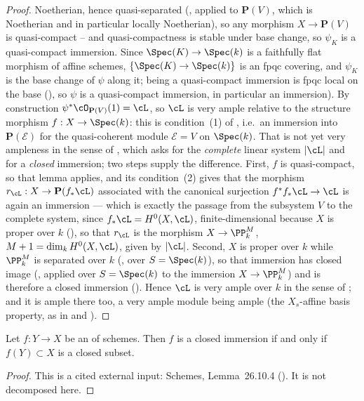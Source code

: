 \begin{proof}
Noetherian, hence
quasi-separated (,
applied to $\mathbf P(V)$, which is Noetherian and in particular
locally Noetherian), so any morphism $X\to\mathbf P(V)$ is quasi-compact
-- and quasi-compactness is stable under base change, so $\psi_K$ is a
quasi-compact immersion.  Since $\Spec(K)\to\Spec(k)$ is a faithfully
flat morphism of affine schemes, $\{\Spec(K)\to\Spec(k)\}$ is an fpqc
covering, and $\psi_K$ is the base change of $\psi$ along it; being a
quasi-compact immersion is fpqc local on the base
(), so $\psi$ is a quasi-compact
immersion, in particular an immersion).
By construction $\psi^*\cO_{\mathbf P(V)}(1)=\cL$, so $\cL$ is very
ample relative to the structure morphism $f:X\to\Spec(k)$: this is
condition~(1) of , i.e.\ an immersion
into $\mathbf P(\mathcal E)$ for the quasi-coherent module
$\mathcal E=V$ on $\Spec(k)$.  That is not yet very ampleness in the
sense of , which asks for the \emph{complete}
linear system $|\cL|$ and for a \emph{closed} immersion; two steps
supply the difference.  First, $f$ is quasi-compact, so that lemma
applies, and its condition~(2) gives that the morphism
$r_{\cL}:X\to\mathbf P(f_*\cL)$ associated with the canonical
surjection $f^*f_*\cL\to\cL$ is again an immersion --- which is
exactly the passage from the subsystem $V$ to the complete system,
since $f_*\cL=H^0(X,\cL)$, finite-dimensional because $X$ is proper
over $k$ (), so that $r_{\cL}$ is the
morphism $X\to\PP^M_k$, $M+1=\dim_kH^0(X,\cL)$, given by $|\cL|$.
Second, $X$ is proper over $k$ while $\PP^M_k$ is separated over $k$
(, over $S=\Spec(k)$),
so that immersion has closed image
(, applied over $S=\Spec(k)$ to the
immersion $X\to\PP^M_k$) and is therefore a closed
immersion ().  Hence $\cL$ is very ample over $k$ in the sense of
; and it is ample there too, a very ample module
being ample (the
$X_s$-affine basis property, as in
 and ).
\end{proof}

\begin{lemma}
\label{lem:pc-immersion-closed-image}
Let $f:Y\to X$ be an
 of schemes.  Then $f$
is a closed immersion if and only if $f(Y)\subset X$ is a closed
subset.
\end{lemma}
\begin{proof}
This is a cited external input: Schemes, Lemma~26.10.4
().  It is not decomposed here.
\end{proof}

